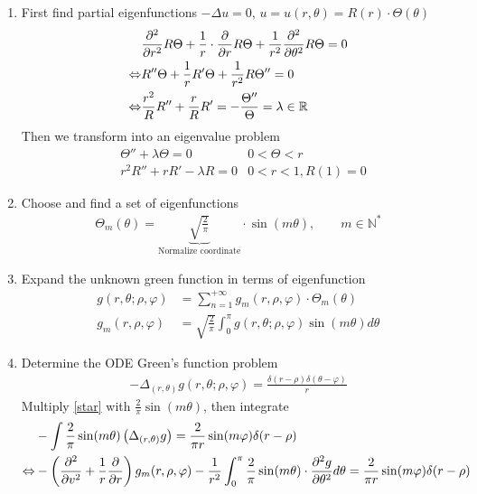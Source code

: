 \documentclass{article}
\numberwithin{equation}{section}
\newcommand{\<}{\langle}
\begin{document}
\begin{enumerate}[1)]
\item First find partial eigenfunctions
$- \Delta u = 0$, $u = u(r, \theta) = R(r) \cdot \Theta(\theta)$
\begin{align}
	&\frac{\partial^2}{\partial r^2}  R \Theta+ \frac{1}{r} \cdot \frac{\partial}{\partial r} R \Theta+ \frac{1}{r^2} \frac{\partial^2}{\partial \theta^2}R \Theta = 0 \notag \\
	\Leftrightarrow&R''\Theta+ \frac{1}{r}R'\Theta+ \frac{1}{r^2}R \Theta'' = 0\notag\\
	\Leftrightarrow & \frac{r^2}{R}R''+ \frac{r}{R}R' = - \frac{\Theta''}{\Theta} = \lambda \in \mathbb{R}
\end{align}
Then we transform into an eigenvalue problem
\begin{align}
	&\Theta''+ \lambda \Theta = 0  &0 < \Theta < r\\
	& r^2 R'' + r R' - \lambda R = 0 &0 < r < 1, R(1) = 0
\end{align}
\item Choose and find a set of eigenfunctions
\begin{align}
	\Theta_m(\theta) = \underbrace{\sqrt{\frac{2}{\pi}}}_{\text{Normalize coordinate}} \cdot \sin(m \theta),\qquad m \in \mathbb{N}^*
\end{align}
\item Expand the unknown green function in terms of eigenfunction
\begin{align}
	g(r, \theta; \rho, \varphi)& = \sum_{n=1}^{+\infty } g_m(r, \rho , \varphi)\cdot \Theta_m(\theta) \\
	g_m(r, \rho , \varphi) &= \sqrt{\frac{2}{\pi}} \int_{0}^\pi g(r, \theta; \rho, \varphi) \sin(m \theta) d \theta 
\end{align}
\item Determine the ODE Green's function problem
\begin{align}
	- \Delta_{(r, \theta)}g(r, \theta; \rho, \varphi) = \frac{\delta(r- \rho) \delta(\theta - \varphi)}{r} \label{star}
\end{align}
Multiply \eqref{star} with $\frac{2}{\pi} \sin(m \theta)$, then integrate
\begin{align}
 	&- \int \frac{2}{\pi} \sin(m \theta) \left(\Delta_{(r, \theta)} g\right) = \frac{2 }{\pi r} \sin(m \varphi) \delta(r - \rho) \notag\\
 	\Leftrightarrow & - \left(\frac{\partial^2}{\partial v^2}+ \frac{1}{r} \frac{\partial}{\partial r}\right) g_m(r, \rho, \varphi) - \frac{1}{r^2} \int_0^ \pi \frac{2}{\pi} \sin(m \theta) \cdot  \frac{\partial^2 g}{\partial \theta^2} d \theta = \frac{2 }{\pi r} \sin(m \varphi) \delta(r - \rho) \notag\\

\end{align}
\end{enumerate}
\end{document}
